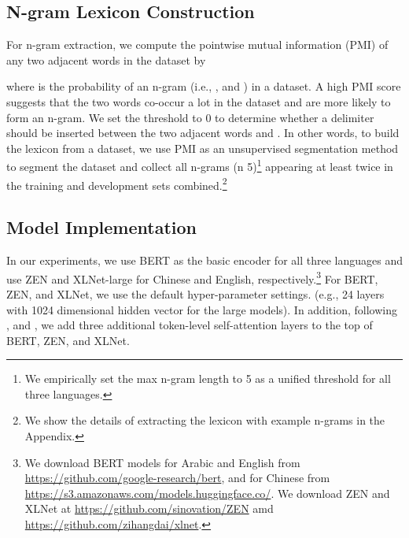 \documentclass[11pt,a4paper]{article}
\begin{document}
\subsection{N-gram Lexicon Construction}

For n-gram extraction, 
we compute the pointwise mutual information (PMI) of any two adjacent words
 in the dataset by

where  is the probability of an n-gram (i.e., ,  and ) in a dataset. 
A high PMI score suggests that the two words co-occur a lot in the dataset and are more likely to form an n-gram.
We set the threshold to 0 to determine whether a delimiter should be inserted between the two adjacent words  and .
In other words, to build the lexicon  from a dataset, we use PMI as an unsupervised segmentation method
to segment the dataset and collect all n-grams (n  5)\footnote{We empirically set the max n-gram length to 5 as a unified threshold for all three languages.} appearing at least twice in the training and development sets combined.\footnote{We show the details of extracting the lexicon with example n-grams in the Appendix.}


\subsection{Model Implementation}

In our experiments, we use BERT \cite{devlin-etal-2019-bert} as the basic encoder for all three languages 
and use ZEN \cite{Sinovation2019ZEN} and XLNet-large \cite{yang-2019-xlnet} for Chinese and English, respectively.\footnote{We download BERT models for Arabic and English from \url{https://github.com/google-research/bert}, and for Chinese from \url{https://s3.amazonaws.com/models.huggingface.co/}.
We download ZEN and XLNet at \url{https://github.com/sinovation/ZEN}
amd \url{https://github.com/zihangdai/xlnet}.}
For BERT, ZEN, and XLNet, we use the default hyper-parameter settings.
(e.g., 
24 layers with 1024 dimensional hidden vector for the large models).
In addition, following 
, 
 and , we add three
additional token-level self-attention layers to the top of BERT, ZEN, and XLNet.
\end{document}
